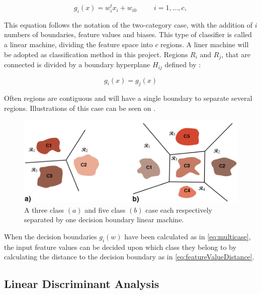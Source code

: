 \begin{equation} \label{eq:multicase}
g_{i}(x) = w^{t}_{i}x_{i} +w_{i0} ~~~~~~~~~~~ i = 1,...,c,
\end{equation}

This equation follows the notation of the two-category case, with the addition of $i$ numbers of boundaries, feature values and biases. This type of classifier is called a linear machine, dividing the feature space into $c$ regions. A liner machine will be adopted as classification method in this project. Regions $R_i$ and $R_j$, that are connected is divided by a boundary hyperplane $H_{ij}$ defined by \cite{Duda2000}:

\begin{equation}
g_i(x) = g_j(x)
\end{equation}

Often regions are contiguous and will have a single boundary to separate several regions. \cite{Duda2000} Illustrations of this case can be seen on . 

\begin{figure}[H]                 
	\includegraphics[width=.6\textwidth]{figures/xBackground/LMregions}  
	\caption{A three class $(a)$ and five class $(b)$ case each respectively separated by one decision boundary linear machine. \cite{Duda2000}}
	\label{fig:LMregions} 
\end{figure}

When the decision boundaries $g_i(w)$ have been calculated as in \eqref{eq:multicase}, the input feature values can be decided upon which class they belong to by calculating the distance to the decision boundary as in \eqref{eq:featureValueDistance}. 


\subsection{Linear Discriminant Analysis} \label{sub:BG:LDA}

